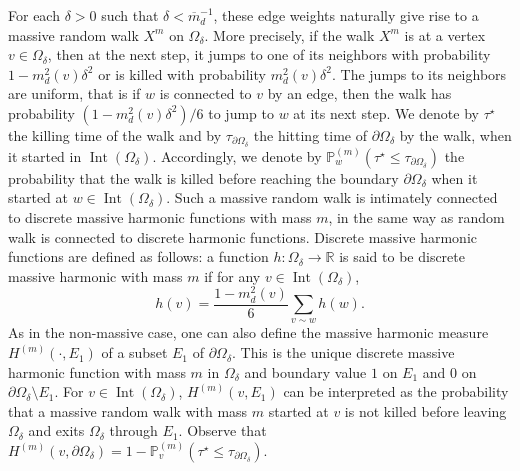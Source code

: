 \documentclass{article}
\newcommand{\PP}{{\mathbb{P}}}
\theoremstyle{definition}
\theoremstyle{remark}
\theoremstyle{remark}
\begin{document}
For each $\delta > 0$ such that $\delta < \overline{m}_d^{-1}$, these edge weights naturally give rise to a massive random walk $X^m$ on $\Omega_{\delta}$. More precisely, if the walk $X^m$ is at a vertex $v \in \Omega_{\delta}$, then at the next step, it jumps to one of its neighbors with probability $1-m^2_d(v)\delta^2$ or is killed with probability $m_d^2(v)\delta^2$. The jumps to its neighbors are uniform, that is if $w$ is connected to $v$ by an edge, then the walk has probability $(1-m^2_d(v)\delta^2)/6$ to jump to $w$ at its next step. We denote by $\tau^{\star}$ the killing time of the walk and by $\tau_{\partial \Omega_{\delta}}$ the hitting time of $\partial \Omega_{\delta}$ by the walk, when it started in $\operatorname{Int}(\Omega_{\delta})$. Accordingly, we denote by $\PP^{(m)}_{w}(\tau^{\star} \leq \tau_{\partial \Omega_{\delta}})$ the probability that the walk is killed before reaching the boundary $\partial \Omega_{\delta}$ when it started at $w \in \operatorname{Int}(\Omega_{\delta})$. Such a massive random walk is intimately connected to discrete massive harmonic functions with mass $m$, in the same way as random walk is connected to discrete harmonic functions. Discrete massive harmonic functions are defined as follows: a function $h: \Omega_{\delta} \to \mathbb{R}$ is said to be discrete massive harmonic with mass $m$ if for any $v \in \operatorname{Int}(\Omega_{\delta})$,
\begin{equation} \label{def_mharm}
    h(v) = \frac{1-m_d^2(v)}{6} \sum_{v \sim w} h(w).
\end{equation}
As in the non-massive case, one can also define the massive harmonic measure $H^{(m)}(\cdot, E_1)$ of a subset $E_1$ of $\partial \Omega_{\delta}$. This is the unique discrete massive harmonic function with mass $m$ in $\Omega_{\delta}$ and boundary value $1$ on $E_1$ and $0$ on $\partial \Omega_{\delta} \setminus E_1.$ For $v \in \operatorname{Int}(\Omega_{\delta})$, $H^{(m)}(v,E_1)$ can be interpreted as the probability that a massive random walk with mass $m$ started at $v$ is not killed before leaving $\Omega_{\delta}$ and exits $\Omega_{\delta}$ through $E_1$. Observe that $H^{(m)}(v, \partial \Omega_{\delta}) = 1 - \PP_v^{(m)}(\tau^\star \leq \tau_{\partial \Omega_{\delta}})$.
\end{document}
